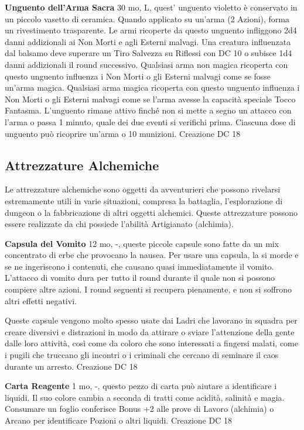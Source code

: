 \documentclass[a4paper,11pt,twoside,openany]{book}
\begin{document}
\textbf{Unguento dell'Arma Sacra} 30 mo, L, quest' unguento violetto è conservato in un piccolo vasetto di ceramica. Quando applicato su un'arma (2 Azioni), forma un rivestimento trasparente. Le armi ricoperte da questo unguento infliggono 2d4 danni addizionali ai Non Morti e agli Esterni malvagi.
Una creatura influenzata dal balsamo deve superare un Tiro Salvezza su Riflessi con DC 10 o subisce 1d4 danni addizionali il round successivo. Qualsiasi arma non magica ricoperta con questo unguento influenza i Non Morti o gli Esterni malvagi come se fosse un'arma magica. Qualsiasi arma magica ricoperta con questo unguento influenza i Non Morti o gli Esterni malvagi come se l'arma avesse la capacità speciale Tocco Fantasma. L'unguento rimane attivo finché non si mette a segno un attacco con l'arma o passa 1 minuto, quale dei due eventi si verifichi prima. Ciascuna dose di unguento può ricoprire un'arma o 10 munizioni. Creazione DC 18

\subsection{Attrezzature Alchemiche}

\label{attrezzature-alchemiche}

Le attrezzature alchemiche sono oggetti da avventurieri che possono rivelarsi estremamente utili in varie situazioni, compresa la battaglia, l'esplorazione di dungeon o la fabbricazione di altri oggetti alchemici. Queste attrezzature possono essere realizzate da chi possiede l'abilità Artigianato (alchimia).

\textbf{Capsula del Vomito} 12 mo, -, queste piccole capsule sono fatte da un mix concentrato di erbe che provocano la nausea. Per usare una capsula, la si morde e se ne ingeriscono i contenuti, che causano quasi immediatamente il vomito. L'attacco di vomito dura per tutto il round durante il quale non si possono compiere altre azioni. I round seguenti si recupera pienamente, e non si soffrono altri effetti negativi.

Queste capsule vengono molto spesso usate dai Ladri che lavorano in squadra per creare diversivi e distrazioni in modo da attirare o sviare l'attenzione della gente dalle loro attività, così come da coloro che sono interessati a fingersi malati, come i pugili che truccano gli incontri o i criminali che cercano di seminare il caos durante un arresto. Creazione DC 18

\textbf{Carta Reagente} 1 mo, -, questo pezzo di carta può aiutare a identificare i liquidi. Il suo colore cambia a seconda di tratti come acidità, salinità e magia. Consumare un foglio conferisce Bonus +2 alle prove di Lavoro (alchimia) o Arcano per identificare Pozioni o altri liquidi. Creazione DC 18
\end{document}

